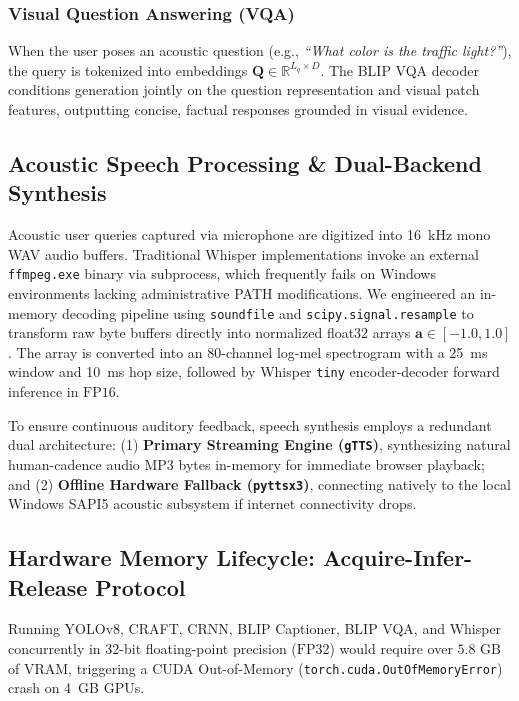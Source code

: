 \documentclass[conference]{IEEEtran}
\begin{document}
\subsubsection{Visual Question Answering (VQA)}
When the user poses an acoustic question (e.g., \textit{``What color is the traffic light?''}), the query is tokenized into embeddings $\mathbf{Q} \in \mathbb{R}^{L_q \times D}$. The BLIP VQA decoder conditions generation jointly on the question representation and visual patch features, outputting concise, factual responses grounded in visual evidence.

\subsection{Acoustic Speech Processing \& Dual-Backend Synthesis}
Acoustic user queries captured via microphone are digitized into 16~kHz mono WAV audio buffers. Traditional Whisper implementations invoke an external \texttt{ffmpeg.exe} binary via subprocess, which frequently fails on Windows environments lacking administrative PATH modifications. We engineered an in-memory decoding pipeline using \texttt{soundfile} and \texttt{scipy.signal.resample} to transform raw byte buffers directly into normalized float32 arrays $\mathbf{a} \in [-1.0, 1.0]$. The array is converted into an 80-channel log-mel spectrogram with a 25~ms window and 10~ms hop size, followed by Whisper \texttt{tiny} encoder-decoder forward inference in $\text{FP16}$.

To ensure continuous auditory feedback, speech synthesis employs a redundant dual architecture: (1) \textbf{Primary Streaming Engine (\texttt{gTTS})}, synthesizing natural human-cadence audio MP3 bytes in-memory for immediate browser playback; and (2) \textbf{Offline Hardware Fallback (\texttt{pyttsx3})}, connecting natively to the local Windows SAPI5 acoustic subsystem if internet connectivity drops.

\subsection{Hardware Memory Lifecycle: Acquire-Infer-Release Protocol}
Running YOLOv8, CRAFT, CRNN, BLIP Captioner, BLIP VQA, and Whisper concurrently in 32-bit floating-point precision ($\text{FP32}$) would require over $5.8\text{ GB}$ of VRAM, triggering a CUDA Out-of-Memory (\texttt{torch.cuda.OutOfMemoryError}) crash on 4~GB GPUs.
\end{document}
